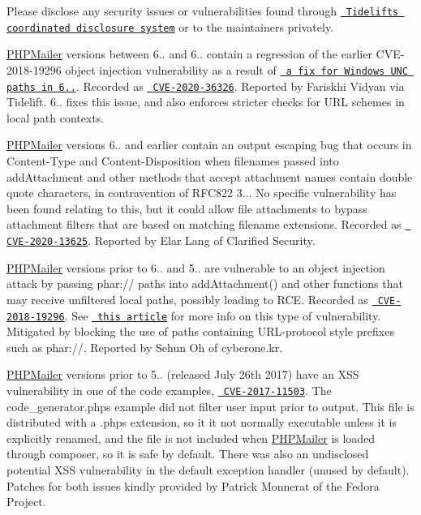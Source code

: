 Please disclose any security issues or vulnerabilities found through \href{https://tidelift.com/security}{\texttt{ Tidelift\textquotesingle{}s coordinated disclosure system}} or to the maintainers privately.

\mbox{\hyperlink{namespace_p_h_p_mailer}{PHPMailer}} versions between 6.. and 6.. contain a regression of the earlier CVE-\/2018-\/19296 object injection vulnerability as a result of \href{https://github.com/PHPMailer/PHPMailer/commit/e2e07a355ee8ff36aba21d0242c5950c56e4c6f9}{\texttt{ a fix for Windows UNC paths in 6..}}. Recorded as \href{https://web.nvd.nist.gov/view/vuln/detail?vulnId=CVE-2020-36326}{\texttt{ CVE-\/2020-\/36326}}. Reported by Fariskhi Vidyan via Tidelift. 6.. fixes this issue, and also enforces stricter checks for URL schemes in local path contexts.

\mbox{\hyperlink{namespace_p_h_p_mailer}{PHPMailer}} versions 6.. and earlier contain an output escaping bug that occurs in {\ttfamily Content-\/\+Type} and {\ttfamily Content-\/\+Disposition} when filenames passed into {\ttfamily add\+Attachment} and other methods that accept attachment names contain double quote characters, in contravention of RFC822 3... No specific vulnerability has been found relating to this, but it could allow file attachments to bypass attachment filters that are based on matching filename extensions. Recorded as \href{https://web.nvd.nist.gov/view/vuln/detail?vulnId=CVE-2020-13625}{\texttt{ CVE-\/2020-\/13625}}. Reported by Elar Lang of Clarified Security.

\mbox{\hyperlink{namespace_p_h_p_mailer}{PHPMailer}} versions prior to 6.. and 5.. are vulnerable to an object injection attack by passing {\ttfamily phar\+://} paths into {\ttfamily add\+Attachment()} and other functions that may receive unfiltered local paths, possibly leading to RCE. Recorded as \href{https://web.nvd.nist.gov/view/vuln/detail?vulnId=CVE-2018-19296}{\texttt{ CVE-\/2018-\/19296}}. See \href{https://knasmueller.net/5-answers-about-php-phar-exploitation}{\texttt{ this article}} for more info on this type of vulnerability. Mitigated by blocking the use of paths containing URL-\/protocol style prefixes such as {\ttfamily phar\+://}. Reported by Sehun Oh of cyberone.\+kr.

\mbox{\hyperlink{namespace_p_h_p_mailer}{PHPMailer}} versions prior to 5.. (released July 26th 2017) have an XSS vulnerability in one of the code examples, \href{https://web.nvd.nist.gov/view/vuln/detail?vulnId=CVE-2017-11503}{\texttt{ CVE-\/2017-\/11503}}. The {\ttfamily code\+\_\+generator.\+phps} example did not filter user input prior to output. This file is distributed with a {\ttfamily .phps} extension, so it it not normally executable unless it is explicitly renamed, and the file is not included when \mbox{\hyperlink{namespace_p_h_p_mailer}{PHPMailer}} is loaded through composer, so it is safe by default. There was also an undisclosed potential XSS vulnerability in the default exception handler (unused by default). Patches for both issues kindly provided by Patrick Monnerat of the Fedora Project.

